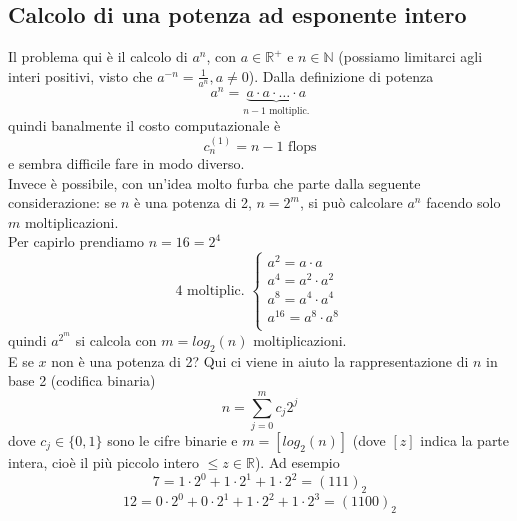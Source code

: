 \documentclass[12pt]{article}
\begin{document}
\subsection{Calcolo di una potenza ad esponente intero}
Il problema qui è il calcolo di $a^n$, con $a\in\mathbb{R}^+$ e $n\in \mathbb{N}$ (possiamo limitarci agli interi positivi, visto che $a^{-n}=\frac{1}{a^n}, a\neq0$). Dalla definizione di potenza
\[a^n = \underbrace{a\cdot a\cdot \dotsc \cdot a }_{n-1 \text{ moltiplic.}} \]
quindi banalmente il costo computazionale è
\[ c_n^{(1)}=n-1 \text{ flops}\]
e sembra difficile fare in modo diverso.\\
Invece è possibile, con un'idea molto furba che parte dalla seguente considerazione: se $n$ è una potenza di 2, $n=2^m$, si può calcolare $a^n$ facendo solo $m$ moltiplicazioni.\\
Per capirlo prendiamo $n=16=2^4$
\[ 4 \text{ moltiplic. }
\begin{cases}
    a^2 = a \cdot a \\
    a^4 = a^2 \cdot a^2 \\
    a^8 = a^4 \cdot a^4 \\
    a^{16} = a^8 \cdot a^8 \\
\end{cases}\]
quindi $a^{2^m}$ si calcola con $m=log_2(n)$ moltiplicazioni.\\
E se $x$ non è una potenza di 2? Qui ci viene in aiuto la rappresentazione di $n$ in base 2 (codifica binaria)
\[n=\sum_{j=0}^m c_j2^j\]
dove $c_j\in{\{0,1\}}$ sono le cifre binarie e $m=[log_2(n)]$ (dove $[z]$ indica la parte intera, cioè il più piccolo intero $\le z\in\mathbb{R}$). Ad esempio
\[7 = 1\cdot 2^0+1\cdot 2^1+1\cdot 2^2=(111)_2\]
\[12=0\cdot 2^0+0\cdot 2^1+1\cdot 2^2+1\cdot 2^3=(1100)_2\]
\end{document}
